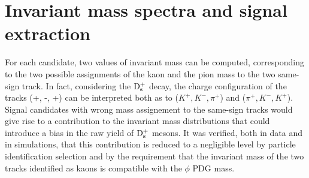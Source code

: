 \section{Invariant mass spectra and signal extraction}
For each candidate, two values of invariant mass can be computed, 
corresponding to the two possible assignments of the kaon and the 
pion mass to the two same-sign track. In fact, considering the ${\rm D_s^+}$
 decay, the charge configuration of the tracks (+, -, +) can be interpreted
  both as to ($K^+,K^-,\pi^+$) and ($\pi^+,K^-,K^+$). Signal candidates with 
  wrong mass assignement to the same-sign tracks would give rise to 
  a contribution to the invariant mass distributions that could introduce
   a bias in the raw yield of ${\rm D_s^+}$ mesons. It was verified, both in 
   data and in simulations, that this contribution is reduced to a negligible 
   level by particle identification selection and by the requirement that the
    invariant mass of the two tracks identified as kaons is compatible with 
    the $\phi$ PDG mass.

